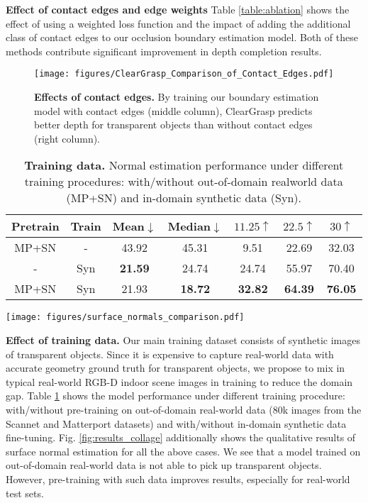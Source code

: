 \documentclass[letterpaper, 10 pt, conference]{ieeeconf}
\newcommand{\myparagraph}[1]{\vspace{0.03in}\noindent\textbf{#1}}
\begin{document}
\myparagraph{Effect of contact edges and edge weights}
Table \ref{table:ablation} shows the effect of using a weighted loss function and the impact of adding the additional class of contact edges to our occlusion boundary estimation model. Both of these methods contribute significant improvement in depth completion results.

\begin{figure}[ht]
\vspace{-1mm}
    \centering
    \texttt{[image: figures/ClearGrasp\_Comparison\_of\_Contact\_Edges.pdf]}
    \caption{\textbf{Effects of contact edges. } By training our boundary estimation model with contact edges (middle column), ClearGrasp predicts better depth for transparent objects than without contact edges (right column).}
    \label{fig:results_contact_edges}
    \vspace{-2mm}
\end{figure}

\begin{table}[t]
    \caption{\textbf{Training data.} Normal estimation performance under different training procedures: with/without out-of-domain realworld data (MP+SN) and in-domain synthetic data (Syn). 
    \label{table:real_pretraining}}
    \vspace{-2mm}
    {\centering
    \setlength\tabcolsep{5.8 pt}
    \begin{tabular}{cc|ccccc}
        \toprule
        Pretrain & Train & Mean$\downarrow$ & Median$\downarrow$ & $11.25\uparrow$ & $22.5\uparrow$ & $30\uparrow$ \\
        \midrule
        MP+SN &  -  & 43.92 & 45.31 & 9.51 & 22.69 & 32.03 \\
        -     & Syn & \textbf{21.59} & 24.74 & 24.74 & 55.97 & 70.40 \\
        MP+SN & Syn & 21.93 & \textbf{18.72} &\textbf{32.82} & \textbf{64.39} &\textbf{76.05} \\
        \bottomrule 
    \end{tabular}
    }
    \vspace{1mm}
    \texttt{[image: figures/surface\_normals\_comparison.pdf]}     
    \vspace{-6mm}
\end{table}

\myparagraph{Effect of training data.}
Our main training dataset consists of synthetic images of transparent objects. Since it is expensive to capture real-world data with accurate geometry ground truth for transparent objects, we propose to mix in typical real-world RGB-D indoor scene images in training to reduce the domain gap. 
Table \ref{table:real_pretraining} shows the model performance under different training procedure: with/without pre-training on out-of-domain real-world data (80k images from the Scannet and Matterport datasets) and with/without in-domain synthetic data fine-tuning.  Fig. \ref{fig:results_collage} additionally shows the qualitative results of surface normal estimation for all the above cases. 
We see that a model trained on out-of-domain real-world data is not able to pick up transparent objects. However, pre-training with such data improves results, especially for real-world test sets.
\end{document}
